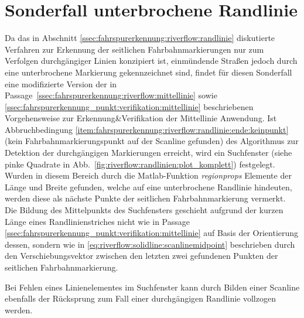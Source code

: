 \section{Sonderfall unterbrochene Randlinie \dcsecondauthorshort} 
\label{sssec:fahrspurerkennung:riverflow:randlinie:gestrichelt}

Da das in Abschnitt \ref{ssec:fahrspurerkennung:riverflow:randlinie} diskutierte Verfahren zur Erkennung der seitlichen Fahrbahnmarkierungen nur zum Verfolgen durchgängiger Linien konzipiert ist, einmündende Straßen jedoch durch eine unterbrochene Markierung gekennzeichnet sind, findet für diesen Sonderfall eine modifizierte Version der in Passage~\ref{ssec:fahrspurerkennung:riverflow:mittellinie} sowie \ref{ssec:fahrspurerkennung_punkt:verifikation:mittellinie} beschriebenen Vorgehensweise zur Erkennung\&Verifikation der Mittellinie Anwendung. Ist Abbruchbedingung \ref{item:fahrspurerkennung:riverflow:randlinie:ende:keinpunkt} (kein Fahrbahnmarkierungspunkt auf der Scanline gefunden) des Algorithmus zur Detektion der durchgängigen Markierungen erreicht, wird ein Suchfenster (siehe pinke Quadrate in Abb.~\ref{fig:riverflow:randlinien:plot_komplett}) festgelegt. Wurden in diesem Bereich durch die Matlab-Funktion \emph{regionprops} Elemente der Länge und Breite gefunden, welche auf eine unterbrochene Randlinie hindeuten, werden diese als nächste Punkte der seitlichen Fahrbahnmarkierung vermerkt. Die Bildung des Mittelpunkts  des Suchfensters geschieht aufgrund der kurzen Länge eines Randlinienstriches nicht wie in Passage \ref{ssec:fahrspurerkennung_punkt:verifikation:mittellinie} auf Basis der Orientierung dessen, sondern wie in \eqref{eq:riverflow:solidline:scanlinemidpoint} beschrieben durch den Verschiebungsvektor zwischen den letzten zwei gefundenen Punkten der seitlichen Fahrbahnmarkierung. 

Bei Fehlen eines Linienelementes im Suchfenster kann durch Bilden einer Scanline ebenfalls der Rücksprung zum Fall einer durchgängigen Randlinie vollzogen werden.